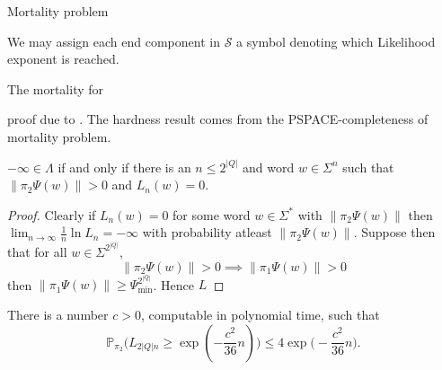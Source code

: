 \documentclass[a4paper,UKenglish,cleveref, autoref,mathscr]{lipics-v2019}
\newcommand{\PP}{\mathbb{P}}
\newcommand{\1}{\mathbbm{1}}
\newcommand{\liexp}{\lim_{n\rightarrow\infty} \frac1n \ln L_n}
\newcommand{\Psimin}{\Psi_{\text{min}}}
\begin{document}
Mortality problem



We may assign each end component in $\mathcal{S}$ a symbol denoting which Likelihood exponent is reached. 


\begin{theorem}
The mortality for 
\end{theorem}

proof due to \cite{karasha09}. The hardness result comes from the PSPACE-completeness of mortality problem. 


\begin{corollary}\label{mortality}
$-\infty \in \Lambda$ if and only if there is an $n \leq 2^{|Q|}$ and word $w \in \Sigma^n$ such that $\| \pi_2 \Psi(w) \| > 0$ and $L_n(w) = 0$.
\end{corollary}

\begin{proof}
Clearly if $L_n(w) = 0$ for some word $w \in \Sigma^*$ with $\| \pi_2 \Psi(w) \|$ then $\liexp = -\infty$ with probability atleast $\| \pi_2 \Psi(w) \|$. Suppose then that for all $w \in \Sigma^{2^{|Q|}}$, 
\begin{equation*}
\| \pi_2 \Psi(w) \| > 0 \implies \| \pi_1 \Psi(w) \| > 0
\end{equation*}
then $\| \pi_1 \Psi(w) \| \geq \Psimin^{2^{|Q|}}$. Hence $L_{}$

\end{proof} 




\begin{lemma}\label{2016profilethm}
There is a number $c > 0$, computable in polynomial time, such that
\begin{equation*}
\PP_{\pi_2}\Big( L_{2|Q|n} \geq \exp( -\frac{c^2}{36} n ) \Big) \leq 4 \exp\Big( -\frac{c^2}{36} n \Big).
\end{equation*}
\end{lemma}
\end{document}
